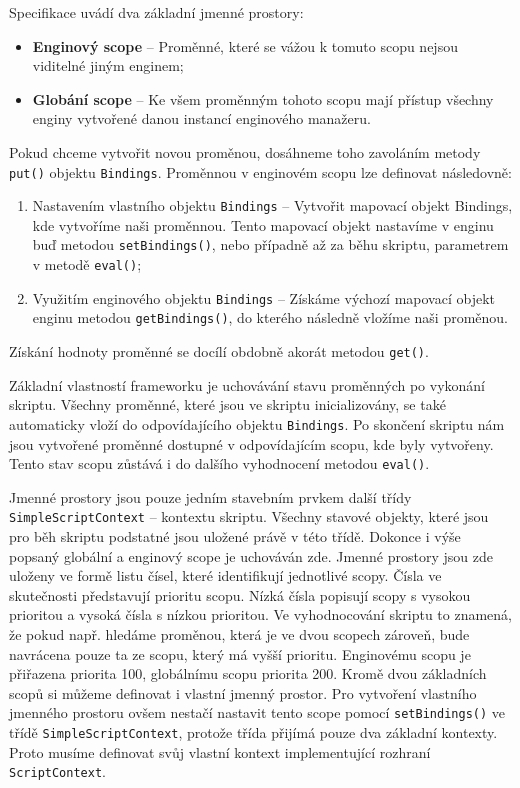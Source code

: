 \bigskip \noindent Specifikace uvádí dva základní jmenné prostory:

\begin{itemize}
  \item \textbf{Enginový scope} -- Proměnné, které se vážou k tomuto scopu nejsou viditelné jiným enginem;
  \item \textbf{Globání scope} -- Ke všem proměnným tohoto scopu mají přístup všechny enginy vytvořené danou instancí enginového manažeru.
\end{itemize}

Pokud chceme vytvořit novou proměnou, dosáhneme toho zavoláním metody \texttt{put()} objektu \texttt{Bindings}. Proměnnou v enginovém scopu lze definovat následovně:

\begin{enumerate}
  \item Nastavením vlastního objektu \texttt{Bindings} -- Vytvořit mapovací objekt Bindings, kde vytvoříme naši proměnnou. Tento mapovací objekt nastavíme v enginu buď metodou \texttt{setBindings()}, nebo případně až za běhu skriptu, parametrem v metodě \texttt{eval()};
  \item Využitím enginového objektu \texttt{Bindings} -- Získáme výchozí mapovací objekt enginu metodou \texttt{getBindings()}, do kterého následně vložíme naši proměnou.
\end{enumerate}

Získání hodnoty proměnné se docílí obdobně akorát metodou \texttt{get()}.

Základní vlastností frameworku je uchovávání stavu proměnných po vykonání skriptu. Všechny proměnné, které jsou ve skriptu inicializovány, se také automaticky vloží do odpovídajícího objektu \texttt{Bindings}. Po skončení skriptu nám jsou vytvořené proměnné dostupné v odpovídajícím scopu, kde byly vytvořeny. Tento stav scopu zůstává i do dalšího vyhodnocení metodou \texttt{eval()}.

Jmenné prostory jsou pouze jedním stavebním prvkem další třídy \texttt{SimpleScriptContext} – kontextu skriptu. Všechny stavové objekty, které jsou pro běh skriptu podstatné jsou uložené právě v této třídě. Dokonce i výše popsaný globální a enginový scope je uchováván zde. Jmenné prostory jsou zde uloženy ve formě listu čísel, které identifikují jednotlivé scopy. Čísla ve skutečnosti představují prioritu scopu. Nízká čísla popisují scopy s vysokou prioritou a vysoká čísla s nízkou prioritou. Ve vyhodnocování skriptu to znamená, že pokud např. hledáme proměnou, která je ve dvou scopech zároveň, bude navrácena pouze ta ze scopu, který má vyšší prioritu. Enginovému scopu je přiřazena priorita 100, globálnímu scopu priorita 200. Kromě dvou základních scopů si můžeme definovat i vlastní jmenný prostor. Pro vytvoření vlastního jmenného prostoru ovšem nestačí nastavit tento scope pomocí \texttt{setBindings()} ve třídě \texttt{SimpleScriptContext}, protože třída přijímá pouze dva základní kontexty. Proto musíme definovat svůj vlastní kontext implementující rozhraní \texttt{ScriptContext}.